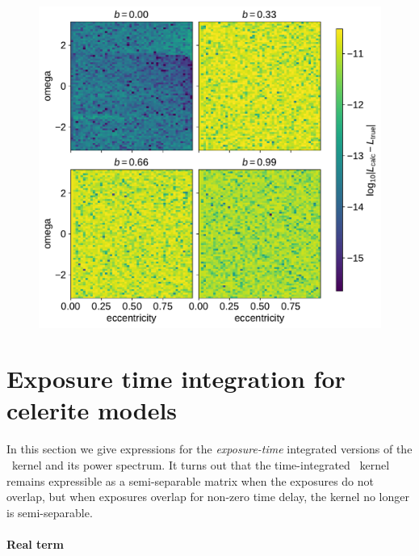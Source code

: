 \documentclass[modern]{aastex62}
\begin{document}
\begin{figure}[htbp]
\begin{centering}
\includegraphics[width=0.8\linewidth]{figures/contact_points.pdf}
\end{centering}
\end{figure}

\section{Exposure time integration for celerite models} \label{sec:time_integration}

In this section we give expressions for the {\it exposure-time}
integrated versions of the \celerite\ kernel and its power
spectrum.  It turns out that the time-integrated \celerite\ kernel
remains expressible as a semi-separable matrix when the exposures
do not overlap, but when exposures overlap for non-zero time delay,
the kernel no longer is semi-separable.

\paragraph{Real term}
\end{document}
